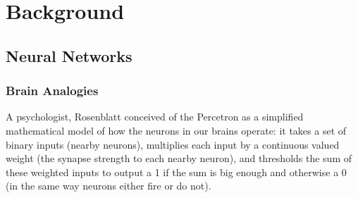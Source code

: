 

\chapter{Background}

\ifpdf
    \graphicspath{{Chapter2/Figs/Raster/}{Chapter2/Figs/PDF/}{Chapter2/Figs/}}
\else
    \graphicspath{{Chapter2/Figs/Vector/}{Chapter2/Figs/}}
\fi



\pagebreak

\section{Neural Networks}
\subsection{Brain Analogies}

A psychologist, Rosenblatt conceived of the Percetron as a simplified mathematical model of how the neurons in our brains operate: it takes a set of binary inputs (nearby neurons), multiplies each input by a continuous valued weight (the synapse strength to each nearby neuron), and thresholds the sum of these weighted inputs to output a 1 if the sum is big enough and otherwise a 0 (in the same way neurons either fire or do not).

